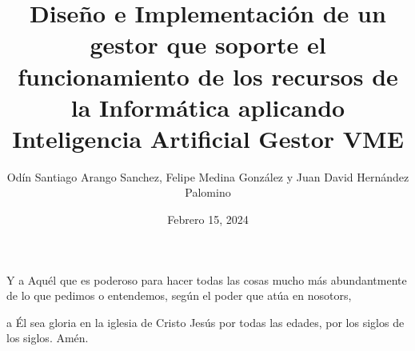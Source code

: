 \documentclass{beamer}
\title{Diseño e Implementación de un gestor que soporte el
funcionamiento de los recursos de la Informática aplicando
Inteligencia Artificial \break
Gestor VME}
\institute{Universidad Central}
\date{Febrero 15, 2024}
\author{Odín Santiago Arango Sanchez,
Felipe Medina González y
Juan David Hernández Palomino}
\begin{document}
\begin{frame}
  \titlepage
\end{frame}





Y a Aquél que es poderoso para hacer todas las cosas mucho más abundantmente de lo que pedimos o entendemos, según el poder que atúa en nosotors,

a Él sea gloria en la iglesia de Cristo Jesús por todas las edades, por los siglos de los siglos. Amén.
\end{document}
